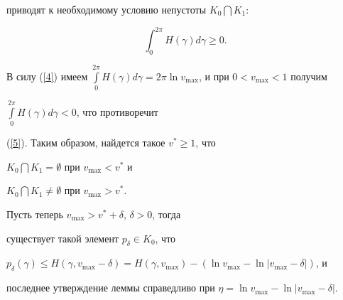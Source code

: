 \begin{pf}
приводят к необходимому условию непустоты $K_{0}\bigcap K_{1}$:


\begin{equation}\label {5}


\int_{0}^{2\pi} H(\gamma) d\gamma\geq 0.


\end{equation}


В силу (\ref{4}) имеем $\int\limits_{0}^{2\pi} H(\gamma) d\gamma =2\pi


\ln v_{\max}$, и при $ 0<v_{\max}<1$ получим


$\int\limits_{0}^{2\pi} H(\gamma) d\gamma < 0$, что противоречит


(\ref{5}). Таким образом, найдется такое $v^{*}\geq1$, что


$K_{0}\bigcap K_{1}=\emptyset$ при $ v_{\max}<v^{*}$ и


$K_{0}\bigcap K_{1}\neq\emptyset$ при $ v_{\max}>v^{*}$.





Пусть теперь $v_{\max}>v^{*}+\delta$, $\delta>0$, тогда


существует такой элемент $p_{\delta}\in K_{0}$, что


$p_{\delta}(\gamma)\leq H(\gamma, v_{\max}-\delta)=H(\gamma,


v_{\max}) - (\ln v_{\max}-\ln|v_{\max}-\delta|)$, и


последнее утверждение леммы справедливо при $\eta=\ln


v_{\max}-\ln|v_{\max}-\delta|$.


\end{pf}





